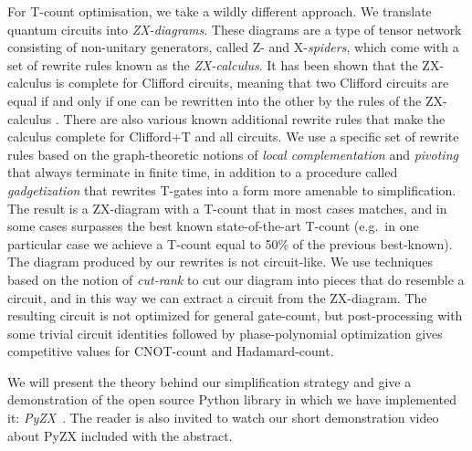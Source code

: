\documentclass[a4paper,11pt]{article}
\begin{document}
For T-count optimisation, we take a wildly different approach. We translate quantum circuits into \emph{ZX-diagrams}. These diagrams are a type of tensor network consisting of non-unitary generators, called Z- and X-\emph{spiders}, which come with a set of rewrite rules known as the \emph{ZX-calculus}. It has been shown that the ZX-calculus is complete for Clifford circuits, meaning that two Clifford circuits are equal if and only if one can be rewritten into the other by the rules of the ZX-calculus \cite{backens2016simplified}. There are also various known additional rewrite rules that make the calculus complete for Clifford+T \cite{jeandel2018complete} and all \cite{HarnyCompleteness} circuits. We use a specific set of rewrite rules based on the graph-theoretic notions of \emph{local complementation} and \emph{pivoting} that always terminate in finite time, in addition to a procedure called \emph{gadgetization} that rewrites T-gates into a form more amenable to simplification. The result is a ZX-diagram with a T-count that in most cases matches, and in some cases surpasses the best known state-of-the-art T-count (e.g.~in one particular case we achieve a T-count equal to 50\% of the previous best-known). The diagram produced by our rewrites is not circuit-like. We use techniques based on the notion of \emph{cut-rank} to cut our diagram into pieces that do resemble a circuit, and in this way we can extract a circuit from the ZX-diagram. The resulting circuit is not optimized for general gate-count, but post-processing with some trivial circuit identities followed by phase-polynomial optimization gives competitive values for CNOT-count and Hadamard-count.

We will present the theory behind our simplification strategy and give a demonstration of the open source Python library in which we have implemented it: \emph{PyZX}~\cite{PyZX}. The reader is also invited to watch our short demonstration video about PyZX included with the abstract.

\newpage



\end{document}

